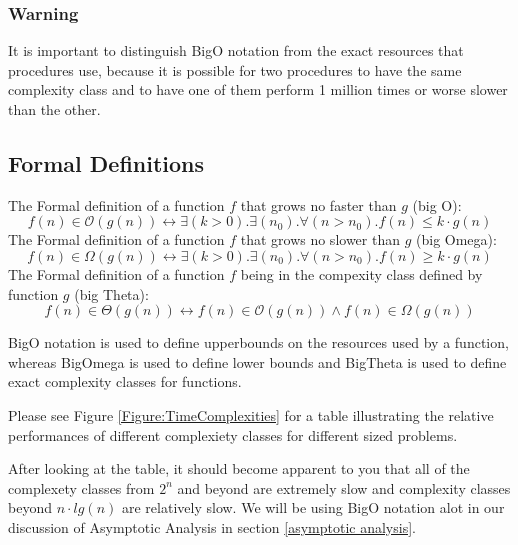 \documentclass[12pt, letterpaper]{book}
\newcommand{\bigO}{\mathcal{O}}
\newcommand{\bigOmega}{\Omega}
\newcommand{\bigTheta}{\Theta}
\begin{document}
\subsubsection{Warning}
It is important to distinguish BigO notation from the exact resources that procedures use, because it is possible for two procedures to have the same complexity class and to have one of them perform 1 million times or worse slower than the other.
\subsection{Formal Definitions}

The Formal definition of a function $f$ that grows no faster than $g$ (big O):
$$f(n) \in \bigO(g(n)) \leftrightarrow \exists(k > 0).\exists(n_{0}). \forall(n > n_{0}).f(n) \le k \cdot g(n)$$
The Formal definition of a function $f$ that grows no slower than $g$ (big Omega):
$$f(n) \in \bigOmega(g(n)) \leftrightarrow \exists(k > 0).\exists(n_{0}). \forall(n > n_{0}).f(n) \ge k \cdot g(n)$$
The Formal definition of a function $f$ being in the compexity class defined by function $g$ (big Theta):
$$f(n) \in \bigTheta(g(n)) \leftrightarrow f(n) \in \bigO(g(n)) \wedge f(n) \in \bigOmega(g(n))$$

BigO notation is used to define upperbounds on the resources used by a function, whereas BigOmega is used to define lower bounds and BigTheta is used to define exact complexity classes for functions.

Please see Figure \ref{Figure:TimeComplexities} for a table illustrating the relative performances of different complexiety classes for different sized problems.

After looking at the table, it should become apparent to you that all of the complexety classes from $2^{n}$ and beyond are extremely slow and complexity classes beyond $n \cdot lg(n)$ are relatively slow. We will be using BigO notation alot in our discussion of Asymptotic Analysis in section \ref{asymptotic analysis}.
\end{document}
